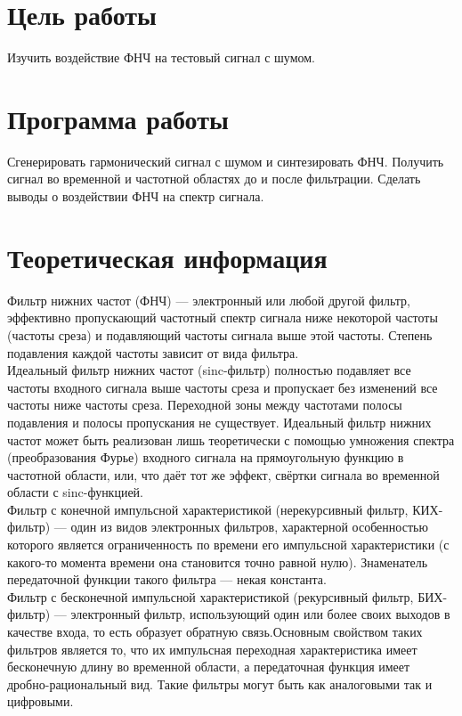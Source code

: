 







\section{Цель работы}
Изучить воздействие ФНЧ на тестовый сигнал с шумом.

\section{Программа работы}
Сгенерировать гармонический сигнал с шумом и синтезировать ФНЧ. Получить сигнал во временной и частотной областях до и после фильтрации. Сделать выводы о воздействии ФНЧ на спектр сигнала.\\


\section{Теоретическая информация}
Фильтр нижних частот (ФНЧ) — электронный или любой другой фильтр, эффективно пропускающий частотный спектр сигнала ниже некоторой частоты (частоты среза) и подавляющий частоты сигнала выше этой частоты. Степень подавления каждой частоты зависит от вида фильтра. \\ Идеальный фильтр нижних частот (sinc-фильтр) полностью подавляет все частоты входного сигнала выше частоты среза и пропускает без изменений все частоты ниже частоты среза. Переходной зоны между частотами полосы подавления и полосы пропускания не существует. Идеальный фильтр нижних частот может быть реализован лишь теоретически с помощью умножения спектра (преобразования Фурье) входного сигнала на прямоугольную функцию в частотной области, или, что даёт тот же эффект, свёртки сигнала во временной области с sinc-функцией. \\ Фильтр с конечной импульсной характеристикой (нерекурсивный фильтр, КИХ-фильтр) — один из видов электронных фильтров, характерной особенностью которого является ограниченность по времени его импульсной характеристики (с какого-то момента времени она становится точно равной нулю). Знаменатель передаточной функции такого фильтра — некая константа. \\ Фильтр с бесконечной импульсной характеристикой (рекурсивный фильтр, БИХ-фильтр) — электронный фильтр, использующий один или более своих выходов в качестве входа, то есть образует обратную связь.Основным свойством таких фильтров является то, что их импульсная переходная характеристика имеет бесконечную длину во временной области, а передаточная функция имеет дробно-рациональный вид. Такие фильтры могут быть как аналоговыми так и цифровыми.


